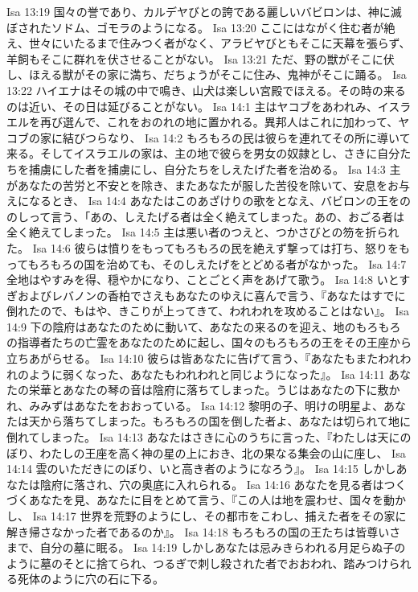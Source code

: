 Isa 13:19  国々の誉であり、カルデヤびとの誇である麗しいバビロンは、神に滅ぼされたソドム、ゴモラのようになる。
Isa 13:20  ここにはながく住む者が絶え、世々にいたるまで住みつく者がなく、アラビヤびともそこに天幕を張らず、羊飼もそこに群れを伏させることがない。
Isa 13:21  ただ、野の獣がそこに伏し、ほえる獣がその家に満ち、だちょうがそこに住み、鬼神がそこに踊る。
Isa 13:22  ハイエナはその城の中で鳴き、山犬は楽しい宮殿でほえる。その時の来るのは近い、その日は延びることがない。
Isa 14:1  主はヤコブをあわれみ、イスラエルを再び選んで、これをおのれの地に置かれる。異邦人はこれに加わって、ヤコブの家に結びつらなり、
Isa 14:2  もろもろの民は彼らを連れてその所に導いて来る。そしてイスラエルの家は、主の地で彼らを男女の奴隷とし、さきに自分たちを捕虜にした者を捕虜にし、自分たちをしえたげた者を治める。
Isa 14:3  主があなたの苦労と不安とを除き、またあなたが服した苦役を除いて、安息をお与えになるとき、
Isa 14:4  あなたはこのあざけりの歌をとなえ、バビロンの王をののしって言う、「あの、しえたげる者は全く絶えてしまった。あの、おごる者は全く絶えてしまった。
Isa 14:5  主は悪い者のつえと、つかさびとの笏を折られた。
Isa 14:6  彼らは憤りをもってもろもろの民を絶えず撃っては打ち、怒りをもってもろもろの国を治めても、そのしえたげをとどめる者がなかった。
Isa 14:7  全地はやすみを得、穏やかになり、ことごとく声をあげて歌う。
Isa 14:8  いとすぎおよびレバノンの香柏でさえもあなたのゆえに喜んで言う、『あなたはすでに倒れたので、もはや、きこりが上ってきて、われわれを攻めることはない』。
Isa 14:9  下の陰府はあなたのために動いて、あなたの来るのを迎え、地のもろもろの指導者たちの亡霊をあなたのために起し、国々のもろもろの王をその王座から立ちあがらせる。
Isa 14:10  彼らは皆あなたに告げて言う、『あなたもまたわれわれのように弱くなった、あなたもわれわれと同じようになった』。
Isa 14:11  あなたの栄華とあなたの琴の音は陰府に落ちてしまった。うじはあなたの下に敷かれ、みみずはあなたをおおっている。
Isa 14:12  黎明の子、明けの明星よ、あなたは天から落ちてしまった。もろもろの国を倒した者よ、あなたは切られて地に倒れてしまった。
Isa 14:13  あなたはさきに心のうちに言った、『わたしは天にのぼり、わたしの王座を高く神の星の上におき、北の果なる集会の山に座し、
Isa 14:14  雲のいただきにのぼり、いと高き者のようになろう』。
Isa 14:15  しかしあなたは陰府に落され、穴の奥底に入れられる。
Isa 14:16  あなたを見る者はつくづくあなたを見、あなたに目をとめて言う、『この人は地を震わせ、国々を動かし、
Isa 14:17  世界を荒野のようにし、その都市をこわし、捕えた者をその家に解き帰さなかった者であるのか』。
Isa 14:18  もろもろの国の王たちは皆尊いさまで、自分の墓に眠る。
Isa 14:19  しかしあなたは忌みきらわれる月足らぬ子のように墓のそとに捨てられ、つるぎで刺し殺された者でおおわれ、踏みつけられる死体のように穴の石に下る。
